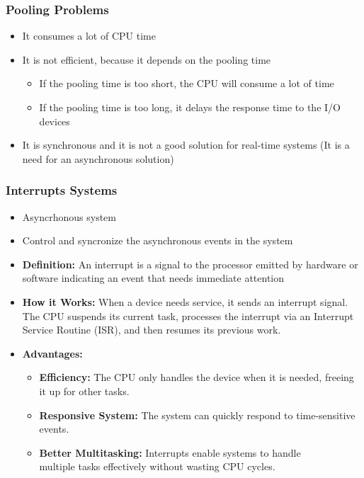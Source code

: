 
\begin{frame}
    \frametitle{Pooling Problems}
    \begin{itemize}
        \item It consumes a lot of CPU time
        \item It is not efficient, because it depends on the pooling time
        \begin{itemize}
            \item If the pooling time is too short, the CPU will consume a lot of time
            \item If the pooling time is too long, it delays the response time to the I/O devices
        \end{itemize}
        \item It is synchronous and it is not a good solution for real-time systems (It is a need for an asynchronous solution)
    \end{itemize}
\end{frame}

\begin{frame}
    \frametitle{Interrupts Systems}
    \begin{itemize}
        \item Asyncrhonous system
        \item Control and syncronize the asynchronous events in the system
        \item \textbf{Definition:} An interrupt is a signal to the processor emitted by hardware or software indicating an event that needs immediate attention
        \item \textbf{How it Works:} When a device needs service, it sends an interrupt signal. The CPU suspends its current task, processes the interrupt via an Interrupt Service Routine (ISR), and then resumes its previous work.
        \item \textbf{Advantages:}
        \begin{itemize}
            \item \textbf{Efficiency:} The CPU only handles the device when it is needed, freeing it up for other tasks.
            \item \textbf{Responsive System:} The system can quickly respond to time-sensitive events.
            \item \textbf{Better Multitasking:} Interrupts enable systems to handle \\ multiple tasks effectively without wasting CPU cycles.
        \end{itemize}
    \end{itemize}
\end{frame}

